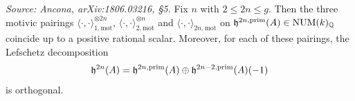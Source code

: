 \begin{lemma}
  \label{lem:lefschetz-pairings}
  \textit{Source: Ancona, arXiv:1806.03216, §5.}
  Fix \(n\) with \(2 \le 2n \le g\). Then the three motivic pairings
  \(\langle \cdot, \cdot \rangle_{1,\mathrm{mot}}^{\otimes 2n}\),
  \(\langle \cdot, \cdot \rangle_{2,\mathrm{mot}}^{\otimes n}\) and
  \(\langle \cdot, \cdot \rangle_{2n,\mathrm{mot}}\) on
  \(\mathfrak{h}^{2n,\mathrm{prim}}(A) \in \mathrm{NUM}(k)_{\mathbb{Q}}\) coincide up to a positive rational scalar.
  Moreover, for each of these pairings, the Lefschetz decomposition
  \[\mathfrak{h}^{2n}(A) = \mathfrak{h}^{2n,\mathrm{prim}}(A) \oplus \mathfrak{h}^{2n-2,\mathrm{prim}}(A)(-1)\]
  is orthogonal.
\end{lemma}

